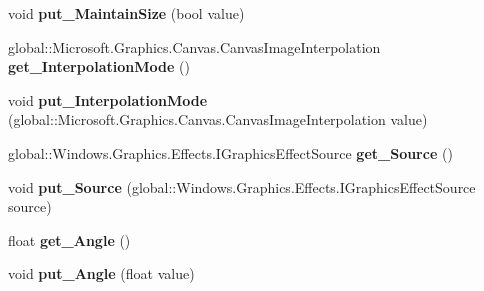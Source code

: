\begin{DoxyCompactItemize}
void {\bfseries put\+\_\+\+Maintain\+Size} (bool value)
\item 
\mbox{\label{interface_microsoft_1_1_graphics_1_1_canvas_1_1_effects_1_1_i_straighten_effect_aea853ec4accf5f13bcfef15bd59e5170}} 
global\+::\+Microsoft.\+Graphics.\+Canvas.\+Canvas\+Image\+Interpolation {\bfseries get\+\_\+\+Interpolation\+Mode} ()
\item 
\mbox{\label{interface_microsoft_1_1_graphics_1_1_canvas_1_1_effects_1_1_i_straighten_effect_ac4bd6a5d0b94a9b353c7cf0854c55f83}} 
void {\bfseries put\+\_\+\+Interpolation\+Mode} (global\+::\+Microsoft.\+Graphics.\+Canvas.\+Canvas\+Image\+Interpolation value)
\item 
\mbox{\label{interface_microsoft_1_1_graphics_1_1_canvas_1_1_effects_1_1_i_straighten_effect_a24ea3cfd1f2bd3a3cff7beeb3a4788a4}} 
global\+::\+Windows.\+Graphics.\+Effects.\+I\+Graphics\+Effect\+Source {\bfseries get\+\_\+\+Source} ()
\item 
\mbox{\label{interface_microsoft_1_1_graphics_1_1_canvas_1_1_effects_1_1_i_straighten_effect_a70f0d6dc9433d17ebdcbe3a4b6b4892c}} 
void {\bfseries put\+\_\+\+Source} (global\+::\+Windows.\+Graphics.\+Effects.\+I\+Graphics\+Effect\+Source source)
\item 
\mbox{\label{interface_microsoft_1_1_graphics_1_1_canvas_1_1_effects_1_1_i_straighten_effect_a4420ccc230f5230df15709e5ac5d785a}} 
float {\bfseries get\+\_\+\+Angle} ()
\item 
\mbox{\label{interface_microsoft_1_1_graphics_1_1_canvas_1_1_effects_1_1_i_straighten_effect_ab42c88ed4087e8529feb2aad22332b17}} 
void {\bfseries put\+\_\+\+Angle} (float value)
\item 
\mbox{\label{interface_microsoft_1_1_graphics_1_1_canvas_1_1_effects_1_1_i_straighten_effect_a42af54b41b4e4299bb05315818ce7183}} 

\end{DoxyCompactItemize}
